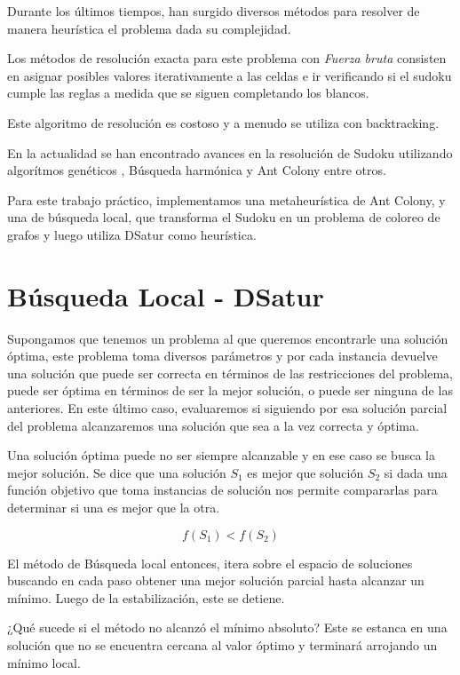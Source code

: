\documentclass[a4paper,spanish]{article}
\begin{document}
Durante los últimos tiempos, han surgido diversos métodos para resolver
de manera heurística el problema dada su complejidad.

Los métodos de resolución exacta para este problema con \emph{Fuerza bruta}
consisten en asignar posibles valores iterativamente a las celdas e ir
verificando si el sudoku cumple las reglas a medida que se siguen completando
los blancos.

Este algoritmo de resolución es costoso y a menudo se utiliza con backtracking.


En la actualidad se han encontrado avances en la resolución de Sudoku utilizando
algorítmos genéticos \cite{mantere}, Búsqueda harmónica
\cite{harmony} y Ant Colony \cite{ant_colony} entre otros.

Para este trabajo práctico, implementamos una metaheurística de Ant Colony, y una
de búsqueda local, que transforma el Sudoku en un problema de coloreo de grafos y
luego utiliza DSatur\cite{dsatur} como heurística.


\section{Búsqueda Local - DSatur}

Supongamos que tenemos un problema al que queremos encontrarle una solución
óptima, este problema toma diversos parámetros y por cada instancia
devuelve una solución que puede ser correcta en términos de las restricciones
del problema, puede ser óptima en términos de ser la mejor solución, o puede ser
ninguna de las anteriores. En este último caso, evaluaremos si siguiendo por esa
solución parcial del problema alcanzaremos una solución que sea a la vez
correcta y óptima.

Una solución óptima puede no ser siempre alcanzable y en ese caso se busca la
mejor solución. Se dice que una solución $S_1$ es mejor que solución $S_2$ si
dada una función objetivo  que toma instancias de solución nos permite
compararlas para determinar si una es mejor que la otra.

\begin{equation}
    f(S_1) < f(S_2) 
\end{equation}


El método de Búsqueda local entonces, itera sobre el espacio de soluciones
buscando en cada paso obtener una mejor solución parcial hasta alcanzar un
mínimo. Luego de la estabilización, este se detiene.

¿Qué sucede si el método no alcanzó el mínimo absoluto? Este se estanca
en una solución que no se encuentra cercana al valor óptimo y terminará
arrojando un mínimo local.
\end{document}
